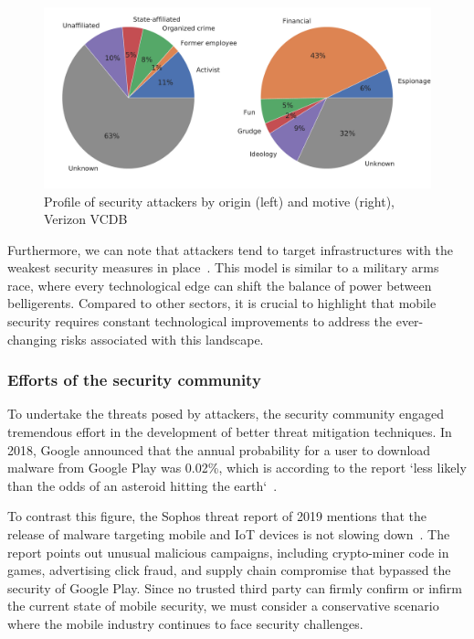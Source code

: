 \begin{figure}[!ht]
        \centering
	\includegraphics[width=\linewidth]{figures/introduction/actors.pdf}
        \caption[Profile of security attackers by origin and motive]{Profile of security attackers by origin (left) and motive (right), Verizon VCDB~\cite{verizon_2018_2019}}
	\label{figure:introduction:actors}
\end{figure}

Furthermore, we can note that attackers tend to target infrastructures with the weakest security measures in place~\cite{verizon_2018_2019}.
This model is similar to a military arms race, where every technological edge can shift the balance of power between belligerents.
Compared to other sectors, it is crucial to highlight that mobile security requires constant technological improvements to address the ever-changing risks associated with this landscape.
\subsubsection{Efforts of the security community}
To undertake the threats posed by attackers, the security community engaged tremendous effort in the development of better threat mitigation techniques.
In 2018, Google announced that the annual probability for a user to download malware from Google Play was 0.02\%, which is according to the report `less likely than the odds of an asteroid hitting the earth`~\cite{google_android_2018}.

To contrast this figure, the Sophos threat report of 2019 mentions that the release of malware targeting mobile and IoT devices is not slowing down~\cite{sophos_sophoslabs_2019}.
The report points out unusual malicious campaigns, including crypto-miner code in games, advertising click fraud, and supply chain compromise that bypassed the security of Google Play.
Since no trusted third party can firmly confirm or infirm the current state of mobile security, we must consider a conservative scenario where the mobile industry continues to face security challenges.
